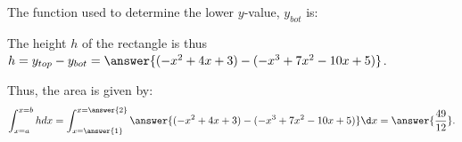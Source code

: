 \documentclass{ximera}
\begin{document}
\begin{exercise}
\begin{exercise}
\begin{exercise}
\begin{exercise}
\begin{exercise}
The function used to determine the lower $y$-value, $y_{bot}$ is:
\begin{multipleChoice}
\end{multipleChoice}

The height $h$ of the rectangle is thus $h=y_{top}-y_{bot} = \answer{( -x^2+4x+3)-(-x^3+7x^2-10x+5)}$.

\begin{exercise}
Thus, the area is given by:
  \[
 \int_{x=a}^{x=b} h dx =  \int_{x=\answer{1}}^{x=\answer{2}} \answer{( -x^2+4x+3)-(-x^3+7x^2-10x+5) } \d x = \answer{\frac{49}{12}}.
  \]

\end{exercise}  
\end{exercise}
\end{exercise}
\end{exercise}
\end{exercise}
\end{exercise}
\end{document}
